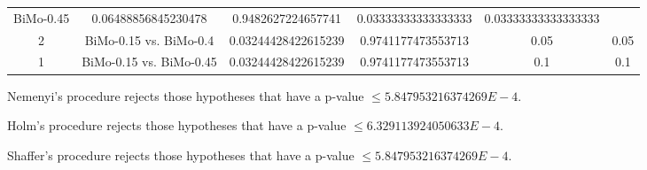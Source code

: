 \documentclass[a4paper,10pt]{article}
\begin{document}
\begin{landscape}
\begin{table}[!htp]
\begin{tabular}{cccccc}
BiMo-0.45&0.06488856845230478&0.9482627224657741&0.03333333333333333&0.03333333333333333\\2&BiMo-0.15 vs. BiMo-0.4&0.03244428422615239&0.9741177473553713&0.05&0.05\\1&BiMo-0.15 vs. BiMo-0.45&0.03244428422615239&0.9741177473553713&0.1&0.1\\\hline
\end{tabular}
\end{table}
Nemenyi's procedure rejects those hypotheses that have a p-value $\le5.847953216374269E-4$.


Holm's procedure rejects those hypotheses that have a p-value $\le6.329113924050633E-4$.


Shaffer's procedure rejects those hypotheses that have a p-value $\le5.847953216374269E-4$.



\end{landscape}
\end{document}
